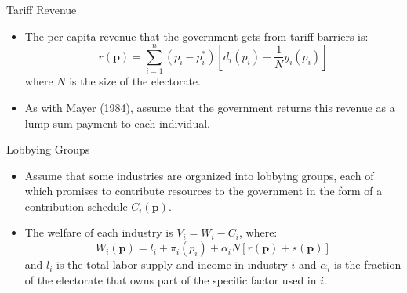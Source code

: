 \documentclass[aspectratio=169]{beamer}
\begin{document}

\begin{frame}{Tariff Revenue}

\begin{itemize}
    \item<1-> The per-capita revenue that the government gets from tariff barriers is:
    \begin{equation*}
        r\left( \mathbf{p} \right) = \sum_{i = 1}^{n} \left( p_{i} - p_{i}^{*} \right) \left[ d_{i}\left( p_{i} \right) - \frac{1}{N} y_{i}\left( p_{i} \right) \right]
    \end{equation*}
    where $ N $ is the size of the electorate.
    \item<2-> As with Mayer (1984), assume that the government returns this revenue as a lump-sum payment to each individual.
\end{itemize}
    
\end{frame}


\begin{frame}{Lobbying Groups}

\begin{itemize}
    \item<1-> Assume that some industries are organized into lobbying groups, each of which promises to contribute resources to the government in the form of a contribution schedule $ C_{i}\left( \mathbf{p} \right) $.
    \item<2-> The welfare of each industry is $ V_{i} = W_{i} - C_{i} $, where:
    \begin{equation*}
        W_{i}\left( \mathbf{p} \right) = l_{i} + \pi_{i}\left( p_{i} \right) +\alpha_{i} N \left[ r\left( \mathbf{p} \right) + s\left( \mathbf{p} \right) \right]
    \end{equation*}
    and $ l_{i} $ is the total labor supply and income in industry $ i $ and $ \alpha_{i} $ is the fraction of the electorate that owns part of the specific factor used in $ i $.
\end{itemize}
    
\end{frame}

\end{document}

